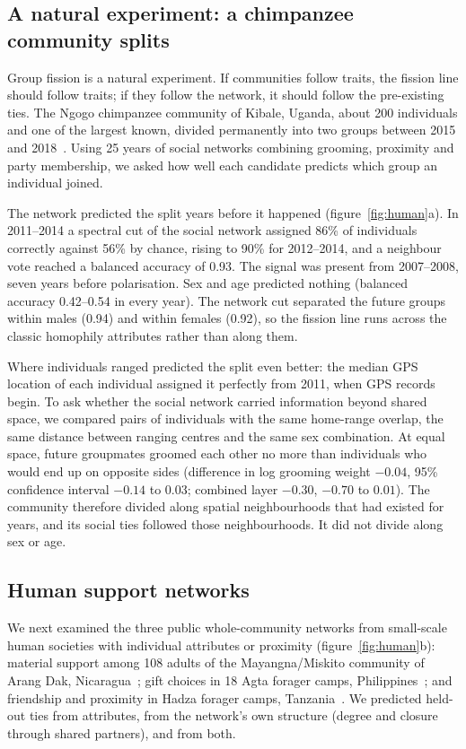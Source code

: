 \documentclass[11pt]{article}
\begin{document}
\subsection{A natural experiment: a chimpanzee community splits}

Group fission is a natural experiment. If communities follow traits, the fission line should follow
traits; if they follow the network, it should follow the pre-existing ties. The Ngogo chimpanzee
community of Kibale, Uganda, about 200 individuals and one of the largest known, divided permanently into
two groups between 2015 and 2018~\cite{Sandel2026}. Using 25 years of social networks combining grooming,
proximity and party membership, we asked how well each candidate predicts which group an individual
joined.

The network predicted the split years before it happened (figure~\ref{fig:human}a). In 2011--2014 a
spectral cut of the social network assigned 86\% of individuals correctly against 56\% by chance, rising
to 90\% for 2012--2014, and a neighbour vote reached a balanced accuracy of 0.93. The signal was present
from 2007--2008, seven years before polarisation. Sex and age predicted nothing (balanced accuracy
0.42--0.54 in every year). The network cut separated the future groups within males (0.94) and within
females (0.92), so the fission line runs across the classic homophily attributes rather than along them.

Where individuals ranged predicted the split even better: the median GPS location of each individual
assigned it perfectly from 2011, when GPS records begin. To ask whether the social network carried
information beyond shared space, we compared pairs of individuals with the same home-range overlap, the
same distance between ranging centres and the same sex combination. At equal space, future groupmates
groomed each other no more than individuals who would end up on opposite sides (difference in log
grooming weight $-0.04$, 95\% confidence interval $-0.14$ to $0.03$; combined layer $-0.30$, $-0.70$ to
$0.01$). The community therefore divided along spatial neighbourhoods that had existed for years, and its
social ties followed those neighbourhoods. It did not divide along sex or age.

\subsection{Human support networks}

We next examined the three public whole-community networks from small-scale human societies with
individual attributes or proximity (figure~\ref{fig:human}b): material support among 108 adults of the
Mayangna/Miskito community of Arang Dak, Nicaragua~\cite{Koster2018}; gift choices in 18 Agta forager
camps, Philippines~\cite{Smith2018Agta}; and friendship and proximity in Hadza forager camps,
Tanzania~\cite{Fedurek2024}. We predicted held-out ties from attributes, from the network's own
structure (degree and closure through shared partners), and from both.
\end{document}
